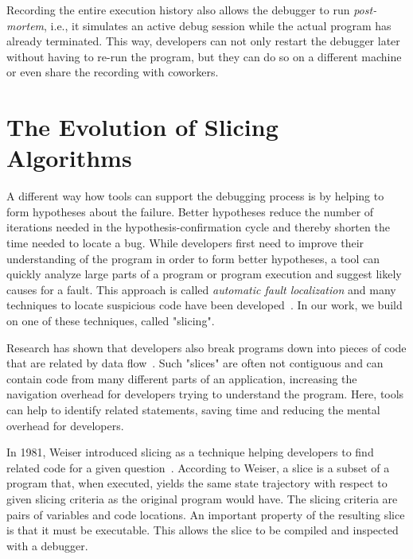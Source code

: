 Recording the entire execution history also allows the debugger to run \emph{post-mortem}, i.e., it simulates an active debug session while the actual program has already terminated.
This way, developers can not only restart the debugger later without having to re-run the program, but they can do so on a different machine or even share the recording with coworkers.


\section{The Evolution of Slicing Algorithms}
\label{sec:evolution_of_slicing}

A different way how tools can support the debugging process is by helping to form hypotheses about the failure.
Better hypotheses reduce the number of iterations needed in the hypothesis-confirmation cycle and thereby shorten the time needed to locate a bug.
While developers first need to improve their understanding of the program in order to form better hypotheses, a tool can quickly analyze large parts of a program or program execution and suggest likely causes for a fault.
This approach is called \emph{automatic fault localization} and many techniques to locate suspicious code have been developed~\cite{wong16:a_survey_on_software}.
In our work, we build on one of these techniques, called "slicing".

Research has shown that developers also break programs down into pieces of code that are related by data flow~\cite{weiser82:programmers_use_slices_when}.
Such "slices" are often not contiguous and can contain code from many different parts of an application, increasing the navigation overhead for developers trying to understand the program.
Here, tools can help to identify related statements, saving time and reducing the mental overhead for developers.

In 1981, Weiser introduced slicing as a technique helping developers to find related code for a given question~\cite{weiser81:program_slicing}.
According to Weiser, a slice is a subset of a program that, when executed, yields the same state trajectory with respect to given slicing criteria as the original program would have.
The slicing criteria are pairs of variables and code locations.
An important property of the resulting slice is that it must be executable.
This allows the slice to be compiled and inspected with a debugger.

